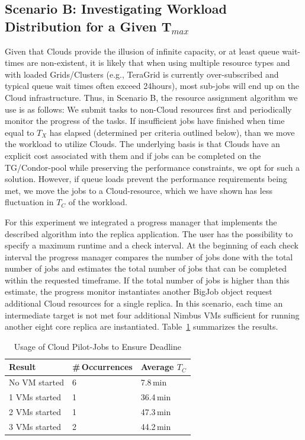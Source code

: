 \documentclass[conference,final]{IEEEtran}
\newcommand{\up}{\vspace*{-1em}}
\newcommand{\tmax}{$T_{max}$ }
\newcommand{\tc}{$T_{C}$ }
\begin{document}
\subsection{Scenario B: Investigating Workload Distribution for a Given T$_{max}$}
\up

Given that Clouds provide the illusion of infinite capacity, or at
least queue wait-times are non-existent, it is likely that when using
multiple resource types and with loaded Grids/Clusters (e.g., TeraGrid
is currently over-subscribed and typical queue wait times often exceed
24hours), most sub-jobs will end up on the Cloud infrastructure.
Thus, in Scenario B, the resource assignment algorithm we use is as
follows: We submit tasks to non-Cloud resources first and periodically
monitor the progress of the tasks. If insufficient jobs have finished
when time equal to $T_{X}$ has elapsed (determined per criteria
outlined below),
than we move the workload to utilize Clouds.  The underlying basis is
that Clouds have an explicit cost associated with them and if jobs can
be completed on the TG/Condor-pool while preserving the performance
constraints, we opt for such a solution. However, if queue loads
prevent the performance requirements being met, we move the jobs to a
Cloud-resource, which we have shown has less fluctuation in \tc of the
workload.

For this experiment we integrated a progress manager that implements
the described algorithm into the replica application.  The user has
the possibility to specify a maximum runtime and a check interval.  At
the beginning of each check interval the progress manager compares the
number of jobs done with the total number of jobs and estimates the
total number of jobs that can be completed within the requested
timeframe. If the total number of jobs is higher than this estimate,
the progress monitor instantiates another BigJob object request
additional Cloud resources for a single replica.  In this scenario,
each time an intermediate target is not met four additional Nimbus VMs
sufficient for running another eight core replica are instantiated.
Table~\ref{tab:app_deadline} summarizes the results.

\begin{table}[ht]
    \centering
	\begin{tabular}{|l|l|l|}
	\hline
    Result & \#\,Occurrences &Average \tc \\ \hline
	No VM started &6 &7.8\,min\\ \hline
	1 VMs started &1 &36.4\,min\\ \hline
	2 VMs started &1 &47.3\,min\\ \hline
	3 VMs started &2 &44.2\,min\\ \hline
	\end{tabular}
	\caption{Usage of Cloud Pilot-Jobs to Ensure Deadline \label{tab:app_deadline}\up}
\end{table}
\end{document}

